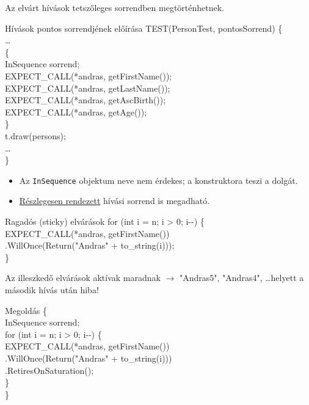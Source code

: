 \documentclass[usenames,dvipsnames,aspectratio=169]{beamer}
\newcommand{\hiv}[1]{{\color{hivatkozasszin}#1}}
\begin{document}
\begin{frame}
    \footnotesize
    Az elvárt hívások tetszőleges sorrendben megtörténhetnek.
    \begin{exampleblock}{Hívások pontos sorrendjének előírása}
        TEST(PersonTest, pontosSorrend) \{ \\
        \qquad \dots \\
        \qquad \{ \\
        \qquad\qquad InSequence sorrend; \\
        \smallskip
        \qquad\qquad EXPECT\_CALL(*andras, getFirstName()); \\
        \qquad\qquad EXPECT\_CALL(*andras, getLastName()); \\
        \qquad\qquad EXPECT\_CALL(*andras, getAscBirth()); \\
        \qquad\qquad EXPECT\_CALL(*andras, getAge()); \\
        \qquad \} \\
        \qquad t.draw(persons); \\
        \qquad \dots \\
        \} %
    \end{exampleblock}
    \begin{itemize}
        \item Az \texttt{InSequence} objektum neve nem érdekes; a konstruktora teszi a dolgát.
        \item \hiv{\href{https://google.github.io/googletest/gmock\_cook\_book.html\#PartialOrder}{Részlegesen rendezett}} hívási sorrend is megadható.
    \end{itemize}
\end{frame}

\begin{frame}
    \small
    \begin{exampleblock}{Ragadós (sticky) elvárások}
        \scriptsize
        for (int i = n; i > 0; i-{-}) \{ \\
        \qquad EXPECT\_CALL(*andras, getFirstName()) \\
        \qquad\qquad .WillOnce(Return("Andras" + to\_string(i))); \\
        \}
    \end{exampleblock}
    Az illeszkedő elvárások aktívak maradnak $\to$ "Andras5", "Andras4", \dots helyett a második hívás után hiba!
    \begin{exampleblock}{Megoldás}
        \scriptsize
        \{ \\ %
        \qquad InSequence sorrend; \\
        \smallskip
        \qquad for (int i = n; i > 0; i-{-}) \{ \\
        \qquad\qquad EXPECT\_CALL(*andras, getFirstName()) \\
        \qquad\qquad\qquad .WillOnce(Return("Andras" + to\_string(i))) \\
        \qquad\qquad\qquad .RetiresOnSaturation(); \\
        \qquad \} \\
        \} %
    \end{exampleblock}
\end{frame}
\end{document}
